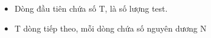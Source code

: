 \begin{itemize}
	\item Dòng đầu tiên chứa số T, là số lượng test.
	\item T dòng tiếp theo, mỗi dòng chứa số nguyên dương N
\end{itemize}